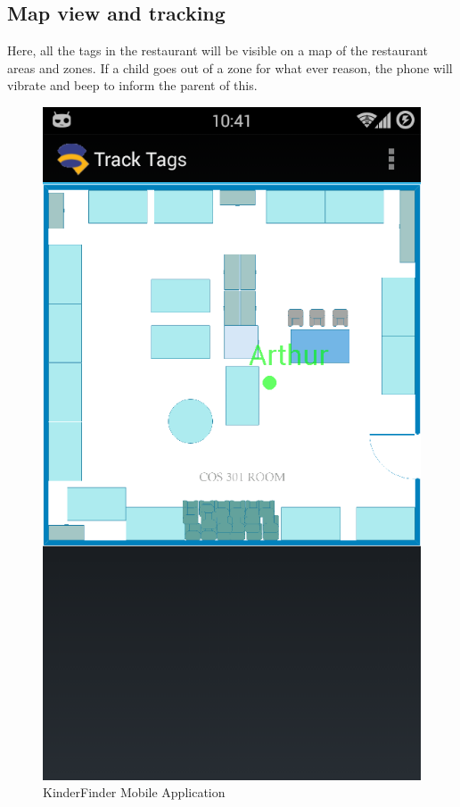 \documentclass{article}
\begin{document}
\subsection{Map view and tracking}
Here, all the tags in the restaurant will be visible on a map of the restaurant areas and zones. If a child goes out of a zone for what ever reason, the phone will vibrate and beep to inform the parent of this.
\begin{figure}[H]
\centering
\includegraphics[scale=0.4]{MainAppTrack Tags.png}
\caption{KinderFinder Mobile Application}
\end{figure}
\end{document}
